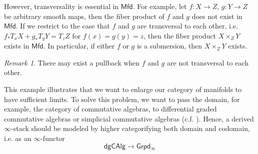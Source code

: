 \documentclass[12pt]{amsart}
\theoremstyle{definition}
\theoremstyle{remark}
\newtheorem{rem}[thm]{Remark}
\numberwithin{equation}{section}
\newcommand{\1}{{\mathbb{1}}}
\newcommand{\mfd}{\mathsf{Mfd}}
\newcommand{\dgcalg}{\mathsf{dgCAlg}}
\newcommand{\igpd}{\mathsf{Grpd_{\infty}}}
\begin{document}
However, transversality is essential in $\mfd$. For example, let $f:X\to Z$, $g:Y\to Z$ be arbitrary smooth maps, then the fiber product of $f$ and $g$ does not exist in $\mfd$. If we restrict to the case that $f$ and $g$ are transversal to each other, i.e. $f_{*}T_xX +g_{*}T_yY=T_zZ$ for $f(x)=g(y)=z$, then the fiber product $X\times_Z Y$ exists in $\mfd$. In particular, if either $f$ or $g$ is a submersion, then $X\times_Z Y$ exists.
\begin{rem}
	There may exist a pullback when $f$ and $g$ are not transversal to each other.
\end{rem}

This example illustrates that we want to enlarge our category of manifolds to have sufficient limits. To solve this problem, we want to pass the domain, for example, the category of commutative algebras, to differential graded commutative algebras or simplicial commutative algebras (c.f. \cite{Lur09a} \cite{TV02}\cite{TV08}). Hence, a derived $\infty$-stack should be modeled by higher categorifying both domain and codomain, i.e. as an $\infty$-functor
\begin{equation*}
    \dgcalg \to \igpd
\end{equation*}
\end{document}
